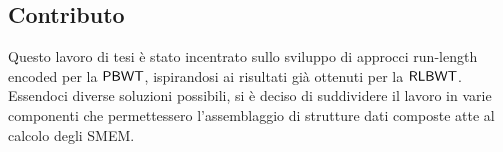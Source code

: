 \documentclass[a4paper,11pt, oneside,italian]{article}
\def\RLBWT{\mbox{\rm {\sf RLBWT}}}
\def\PBWT{\mbox{\rm {\sf PBWT}}}
\begin{document}
\subsection*{Contributo}


Questo lavoro di tesi è stato incentrato sullo sviluppo di approcci run-length
encoded per la $\PBWT$, ispirandosi ai risultati già ottenuti per la $\RLBWT$.
Essendoci diverse soluzioni
possibili, si è deciso di suddividere il lavoro in varie componenti che
permettessero l'assemblaggio di strutture dati composte atte al calcolo degli
SMEM.  
\end{document}
